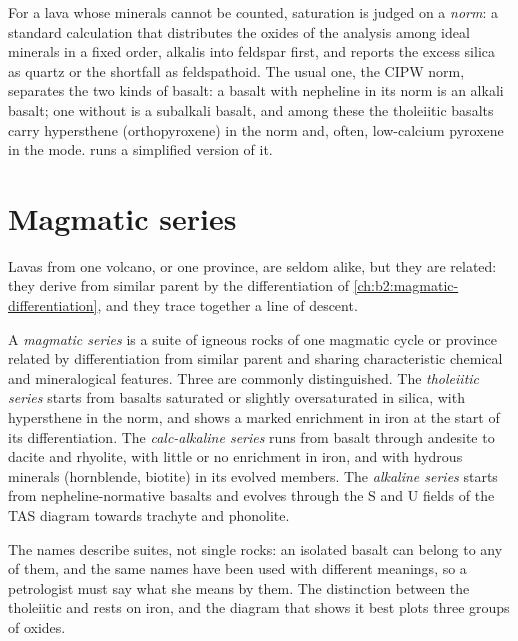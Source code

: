 For a lava whose minerals cannot be counted, saturation is judged on a \emph{norm}: a
standard calculation that distributes the oxides of the analysis among ideal minerals
in a fixed order, alkalis into feldspar first, and reports the excess silica as
quartz or the shortfall as feldspathoid. The usual one, the CIPW norm, separates the
two kinds of basalt: a basalt with nepheline in its norm is an alkali basalt; one
without is a subalkali basalt, and among these the tholeiitic basalts carry
hypersthene (orthopyroxene) in the norm and, often, low-calcium pyroxene in the mode.
 runs a simplified version of it.

\section{Magmatic series}\label{sec:b2:magmatic-series:series}

Lavas from one volcano, or one province, are seldom alike, but they are related: they
derive from similar parent  by the differentiation of
\cref{ch:b2:magmatic-differentiation}, and they trace together a line of descent.

\begin{definition}\label{def:b2:magmatic-series:series}
A \emph{magmatic series} is a suite of igneous rocks of one
magmatic cycle or province related by differentiation from similar parent  and
sharing characteristic chemical and mineralogical features. Three are commonly
distinguished. The \emph{tholeiitic series} starts from
basalts saturated or slightly oversaturated in silica, with hypersthene in the norm,
and shows a marked enrichment in iron at the start of its differentiation. The
\emph{calc-alkaline series} runs from basalt through
andesite to dacite and rhyolite, with little or no enrichment in iron, and with
hydrous minerals (hornblende, biotite) in its evolved members. The \emph{alkaline
series} starts from nepheline-normative basalts and evolves
through the S and U fields of the TAS diagram towards trachyte and phonolite.
\end{definition}

The names describe suites, not single rocks: an isolated basalt can belong to any of
them, and the same names have been used with different meanings, so a petrologist
must say what she means by them. The distinction between the tholeiitic and
 rests on iron, and the diagram that shows it best plots three
groups of oxides.

